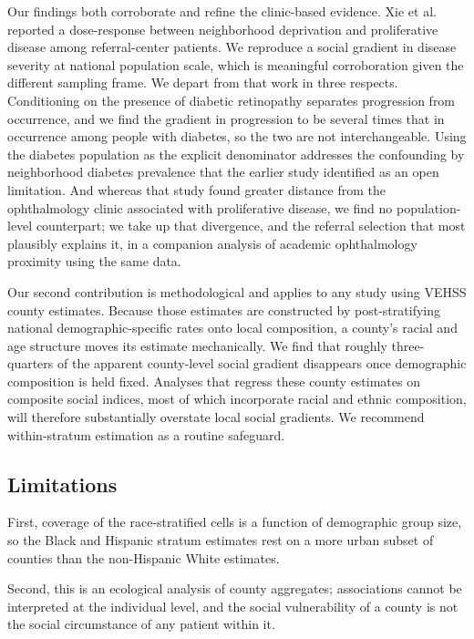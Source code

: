 \documentclass[11pt]{article}
\begin{document}
Our findings both corroborate and refine the clinic-based evidence. Xie et al.
reported a dose-response between neighborhood deprivation and proliferative
disease among referral-center patients.\citep{xie2025} We reproduce a social
gradient in disease severity at national population scale, which is meaningful
corroboration given the different sampling frame. We depart from that work in
three respects. Conditioning on the presence of diabetic retinopathy separates
progression from occurrence, and we find the gradient in progression to be
several times that in occurrence among people with diabetes, so the two are not
interchangeable. Using the diabetes population as the explicit denominator
addresses the confounding by neighborhood diabetes prevalence that the earlier
study identified as an open limitation. And whereas that study found greater
distance from the ophthalmology clinic associated with proliferative disease, we
find no population-level counterpart; we take up that divergence, and the
referral selection that most plausibly explains it, in a companion analysis of
academic ophthalmology proximity using the same data.

Our second contribution is methodological and applies to any study using VEHSS
county estimates. Because those estimates are constructed by post-stratifying
national demographic-specific rates onto local composition, a county's racial
and age structure moves its estimate mechanically. We find that roughly
three-quarters of the apparent county-level social gradient disappears once
demographic composition is held fixed. Analyses that regress these county
estimates on composite social indices, most of which incorporate racial and
ethnic composition, will therefore substantially overstate local social
gradients. We recommend within-stratum estimation as a routine safeguard.

\subsection{Limitations}

First, coverage of the race-stratified cells is a function of demographic group
size, so the Black and Hispanic stratum estimates rest on a more urban subset of
counties than the non-Hispanic White estimates.

Second, this is an ecological analysis of county aggregates; associations cannot
be interpreted at the individual level, and the social vulnerability of a county
is not the social circumstance of any patient within it.
\end{document}
